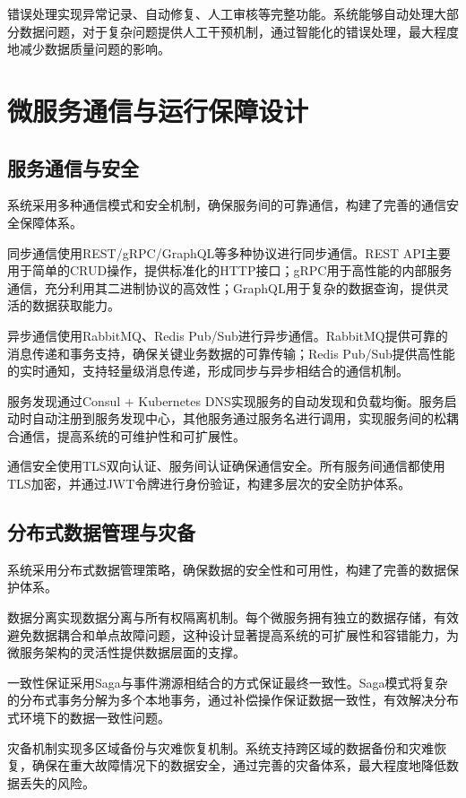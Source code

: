 错误处理实现异常记录、自动修复、人工审核等完整功能。系统能够自动处理大部分数据问题，对于复杂问题提供人工干预机制，通过智能化的错误处理，最大程度地减少数据质量问题的影响。

\section{微服务通信与运行保障设计}

\subsection{服务通信与安全}

系统采用多种通信模式和安全机制，确保服务间的可靠通信，构建了完善的通信安全保障体系。

同步通信使用REST/gRPC/GraphQL等多种协议进行同步通信。REST API主要用于简单的CRUD操作，提供标准化的HTTP接口；gRPC用于高性能的内部服务通信，充分利用其二进制协议的高效性；GraphQL用于复杂的数据查询，提供灵活的数据获取能力。

异步通信使用RabbitMQ、Redis Pub/Sub进行异步通信。RabbitMQ提供可靠的消息传递和事务支持，确保关键业务数据的可靠传输；Redis Pub/Sub提供高性能的实时通知，支持轻量级消息传递，形成同步与异步相结合的通信机制。

服务发现通过Consul + Kubernetes DNS实现服务的自动发现和负载均衡。服务启动时自动注册到服务发现中心，其他服务通过服务名进行调用，实现服务间的松耦合通信，提高系统的可维护性和可扩展性。

通信安全使用TLS双向认证、服务间认证确保通信安全。所有服务间通信都使用TLS加密，并通过JWT令牌进行身份验证，构建多层次的安全防护体系。

\subsection{分布式数据管理与灾备}

系统采用分布式数据管理策略，确保数据的安全性和可用性，构建了完善的数据保护体系。

数据分离实现数据分离与所有权隔离机制。每个微服务拥有独立的数据存储，有效避免数据耦合和单点故障问题，这种设计显著提高系统的可扩展性和容错能力，为微服务架构的灵活性提供数据层面的支撑。

一致性保证采用Saga与事件溯源相结合的方式保证最终一致性。Saga模式将复杂的分布式事务分解为多个本地事务，通过补偿操作保证数据一致性，有效解决分布式环境下的数据一致性问题。

灾备机制实现多区域备份与灾难恢复机制。系统支持跨区域的数据备份和灾难恢复，确保在重大故障情况下的数据安全，通过完善的灾备体系，最大程度地降低数据丢失的风险。

